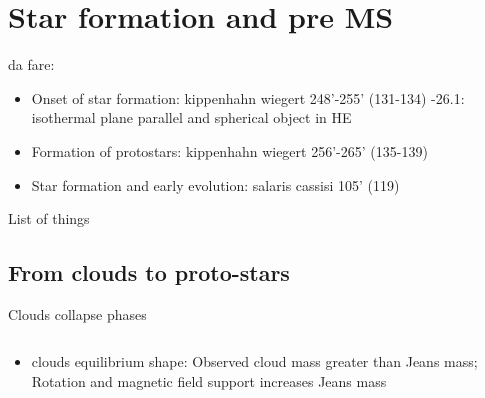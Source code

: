 \section{Star formation and pre MS}

\begin{wordonframe}{da fare: }
\begin{itemize}
\item Onset of star formation: kippenhahn wiegert 248'-255' (131-134) -26.1: isothermal plane parallel and spherical object in HE
\item Formation of protostars: kippenhahn wiegert 256'-265' (135-139)
\item Star formation and early evolution: salaris cassisi 105' (119)
\end{itemize}
\end{wordonframe}


\begin{frame}[allowframebreaks]{List of things}
\listoftodos
\end{frame}

\subsection{From clouds to proto-stars}

\begin{frame}{Clouds collapse phases}
\begin{columns}[T]\begin{column}{0.5\textwidth}
\begin{itemize}
\item clouds equilibrium shape: Observed cloud mass greater than Jeans mass; Rotation and magnetic field support increases Jeans mass
\end{itemize}
	\end{column}\begin{column}{0.5\textwidth}

\end{column}\end{columns}
\end{frame}

